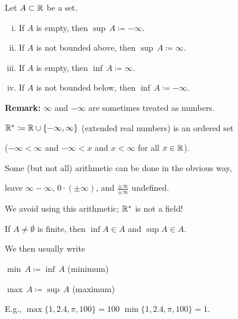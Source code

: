 \documentclass[10pt,aspectratio=149]{beamer}
\begin{document}
\begin{frame}


\begin{definition}
Let $A \subset {\mathbb{R}}$ be a set.
\begin{enumerate}[(i)]
\item \pause If $A$ is empty, then \quad $\sup\, A \coloneqq -\infty$.
\item \pause If $A$ is not bounded above, then \quad $\sup\, A \coloneqq \infty$.
\item \pause If $A$ is empty, then \quad $\inf\, A \coloneqq \infty$.
\item \pause If $A$ is not bounded below, then \quad $\inf\, A \coloneqq -\infty$.
\end{enumerate}
\end{definition}

\pause
\textbf{Remark:}
$\infty$ and $-\infty$ are sometimes treated as numbers.  

\medskip
\pause

${\mathbb{R}}^* \coloneqq {\mathbb{R}} \cup \{ -\infty , \infty\}$ (extended real numbers)
is an ordered set

($-\infty < \infty$ \quad and \quad
$-\infty < x$ and $x < \infty$ for all $x \in {\mathbb{R}}$).

\medskip
\pause

Some (but not all) arithmetic can be done in the obvious way,

\medskip
\pause

leave
$\infty-\infty$, $0 \cdot (\pm\infty)$, and $\frac{\pm\infty}{\pm\infty}$
undefined.

\medskip
\pause

We avoid using this arithmetic;
${\mathbb{R}}^*$ is not a field!

\end{frame}

\begin{frame}
If $A \not= \emptyset$ is finite, then
$\inf A \in A$
and
$\sup A \in A$.

\medskip
\pause

We then usually write

\medskip

$\min\, A \coloneqq \inf\, A$ \qquad (minimum)

\medskip

$\max\, A \coloneqq \sup\, A$ \qquad (maximum)

\medskip
\pause

E.g., \qquad
$\max \{ 1,2.4,\pi,100 \} = 100$ \qquad
$\min \{ 1,2.4,\pi,100 \} = 1$.
\end{frame}
\end{document}
